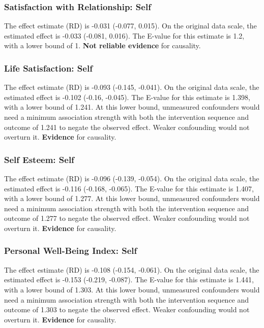 \documentclass[
  singlecolumn]{article}
\begin{document}
\subsubsection{Satisfaction with Relationship:
Self}\label{satisfaction-with-relationship-self-5}

The effect estimate (RD) is -0.031 (-0.077, 0.015). On the original data
scale, the estimated effect is -0.033 (-0.081, 0.016). The E-value for
this estimate is 1.2, with a lower bound of 1. \textbf{Not reliable
evidence} for causality.

\subsubsection{Life Satisfaction: Self}\label{life-satisfaction-self-5}

The effect estimate (RD) is -0.093 (-0.145, -0.041). On the original
data scale, the estimated effect is -0.102 (-0.16, -0.045). The E-value
for this estimate is 1.398, with a lower bound of 1.241. At this lower
bound, unmeasured confounders would need a minimum association strength
with both the intervention sequence and outcome of 1.241 to negate the
observed effect. Weaker confounding would not overturn it.
\textbf{Evidence} for causality.

\subsubsection{Self Esteem: Self}\label{self-esteem-self-5}

The effect estimate (RD) is -0.096 (-0.139, -0.054). On the original
data scale, the estimated effect is -0.116 (-0.168, -0.065). The E-value
for this estimate is 1.407, with a lower bound of 1.277. At this lower
bound, unmeasured confounders would need a minimum association strength
with both the intervention sequence and outcome of 1.277 to negate the
observed effect. Weaker confounding would not overturn it.
\textbf{Evidence} for causality.

\subsubsection{Personal Well-Being Index:
Self}\label{personal-well-being-index-self-5}

The effect estimate (RD) is -0.108 (-0.154, -0.061). On the original
data scale, the estimated effect is -0.153 (-0.219, -0.087). The E-value
for this estimate is 1.441, with a lower bound of 1.303. At this lower
bound, unmeasured confounders would need a minimum association strength
with both the intervention sequence and outcome of 1.303 to negate the
observed effect. Weaker confounding would not overturn it.
\textbf{Evidence} for causality.
\end{document}
